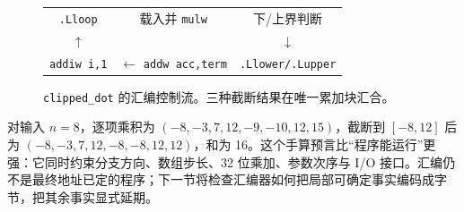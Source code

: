 \begin{figure}[t]
\centering
\begin{tabular}{c@{\quad$\longrightarrow$\quad}c@{\quad$\longrightarrow$\quad}c}
\texttt{.Lloop} & 载入并 \texttt{mulw} & 下/上界判断\\
\(\uparrow\) & & \(\downarrow\)\\
\texttt{addiw i,1} & \(\longleftarrow\) \texttt{addw acc,term} & \texttt{.Llower/.Lupper}\\
\end{tabular}
\caption{\texttt{clipped\_dot} 的汇编控制流。三种截断结果在唯一累加块汇合。}
\label{fig:asm-map}
\end{figure}

对输入 \(n=8\)，逐项乘积为 \((-8,-3,7,12,-9,-10,12,15)\)，截断到 \([-8,12]\) 后为 \((-8,-3,7,12,-8,-8,12,12)\)，和为 16。这个手算预言比“程序能运行”更强：它同时约束分支方向、数组步长、32 位乘加、参数次序与 I/O 接口。汇编仍不是最终地址已定的程序；下一节将检查汇编器如何把局部可确定事实编码成字节，把其余事实显式延期。

